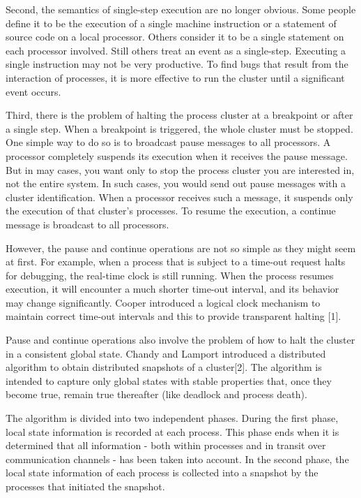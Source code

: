	Second, the semantics of single-step execution are no longer obvious. Some people define it to be the execution of a single machine instruction or a statement of source code on a local processor. Others consider it to be a single statement on each processor involved. Still others treat an event as a single-step. Executing a single instruction may not be very productive. To find bugs that result from the interaction of processes, it is more effective to run the cluster until a significant event occurs.
	
	Third, there is the problem of halting the process cluster at a breakpoint or after a single step. When a breakpoint is triggered, the whole cluster must be stopped. One simple way to do so is to broadcast pause messages to all processors. A processor completely suspends its execution when it receives the pause message. But in may cases, you want only to stop the process cluster you are interested in, not the entire system. In such cases, you would send out pause messages with a cluster identification. When a processor receives such a message, it suspends only the execution of that cluster's processes. To resume the execution, a continue message is broadcast to all processors.
	
	However, the pause and continue operations are not so simple as they might seem at first. For example, when a process that is subject to a time-out request halts for debugging, the real-time clock is still running. When the process resumes execution, it will encounter a much shorter time-out interval, and its behavior may change significantly. Cooper introduced a logical clock mechanism to maintain correct time-out intervals and this to provide transparent halting [1].
	
	Pause and continue operations also involve the problem of how to halt the cluster in a consistent global state. Chandy and Lamport introduced a distributed algorithm to obtain distributed snapshots of a cluster[2]. The algorithm is intended to capture only global states with stable properties that, once they become true, remain true thereafter (like deadlock and process death).
	
	The algorithm is divided into two independent phases. During the first phase, local state information is recorded at each process. This phase ends when it is determined that all information - both within processes and in transit over communication channels - has been taken into account. In the second phase, the local state information of each process is collected into a snapshot by the processes that initiated the snapshot.
	
